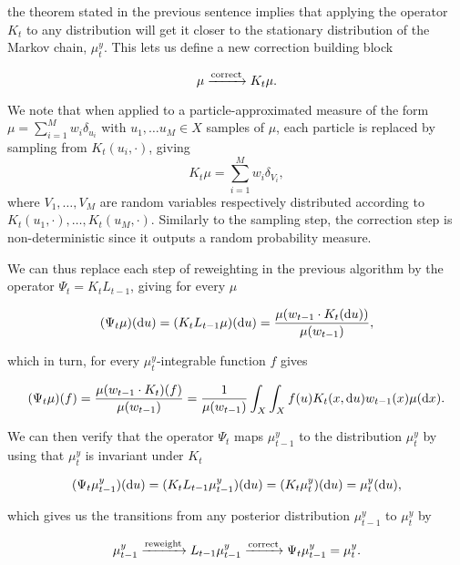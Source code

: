 the theorem stated in the previous sentence implies that applying the operator $K_t$ to any distribution will get it closer to the stationary distribution of the Markov chain, $\mu^y_t$. This lets us define a new correction building block

\begin{equation*}
  \mu \xrightarrow{\text{correct}} K_t\mu.
\end{equation*}

We note that when applied to a particle-approximated measure of the form $\mu = \sum_{i=1}^Mw_i\delta_{u_i}$ with $u_1, \ldots u_M \in X$ samples of $\mu$, each particle is replaced by sampling from $K_t(u_i, \cdot)$, giving
\begin{equation*}
  K_t\mu = \sum_{i=1}^Mw_i\delta_{V_i},
\end{equation*}
where $V_1, \ldots, V_M$ are random variables respectively distributed according to $K_t(u_1, \cdot), \ldots, K_t(u_M, \cdot)$. Similarly to the sampling step, the correction step is non-deterministic since it outputs a random probability measure.

We can thus replace each step of reweighting in the previous algorithm by the operator $\Psi_t = K_tL_{t-1}$, giving for every $\mu$

\begin{equation*}
  (\Psi_t \mu)(\text{d} u) = (K_tL_{t-1}\mu)(\text{d} u) = \frac{\mu(w_{t-1} \cdot K_t(\text{d} u))}{\mu(w_{t-1})},
\end{equation*}

which in turn, for every $\mu^y_t$-integrable function $f$ gives

\begin{equation*}
  (\Psi_t \mu)(f) = \frac{\mu(w_{t-1} \cdot K_t)(f)}{\mu(w_{t-1})} = \frac1{\mu(w_{t-1})}\int_X\int_Xf(u)K_t(x, \text{d} u)w_{t-1}(x)\mu(\text{d} x).
\end{equation*}

We can then verify that the operator $\Psi_t$ maps $\mu^y_{t-1}$ to the distribution $\mu^y_t$ by using that $\mu^y_t$ is invariant under $K_t$

\begin{equation*}
  (\Psi_t\mu^y_{t-1})(\text{d} u)
  = (K_tL_{t-1}\mu^y_{t-1})(\text{d} u)
  = (K_t\mu^y_t)(\text{d} u)
  = \mu^y_t(\text{d} u),
\end{equation*}

which gives us the transitions from any posterior distribution $\mu_{t-1}^y$ to $\mu^y_t$ by

\begin{equation*}
  \mu^y_{t-1} \xrightarrow{\text{reweight}} L_{t-1}\mu^y_{t-1} \xrightarrow{\text{correct}} \Psi_t\mu^y_{t-1} = \mu^y_t.
\end{equation*}

